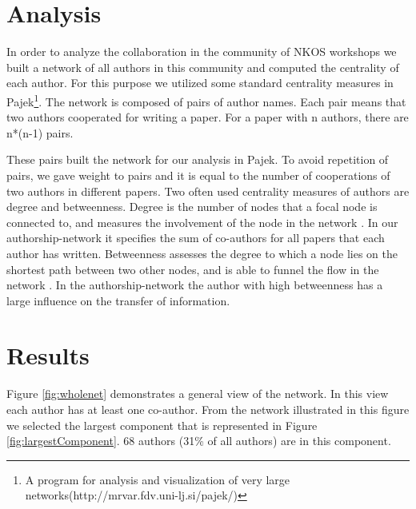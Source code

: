 \documentclass[runningheads,a4paper]{llncs}
\begin{document}


\section{Analysis}\label{analysis}

In order to analyze the collaboration in the community of NKOS workshops we built a network of all authors in this community and computed the centrality of each author. For this purpose we utilized some standard centrality measures in Pajek\footnote{A program for analysis and visualization of very large networks(http://mrvar.fdv.uni-lj.si/pajek/)}. The network is composed of pairs of author names. Each pair means that two authors cooperated for writing a paper. For a paper with n authors, there are n*(n-1) pairs. %

These pairs built the network for our analysis in Pajek. To avoid repetition of pairs, we gave weight to pairs and it is equal to the number of cooperations of two authors in different papers. 
Two often used centrality measures of authors are degree and betweenness. Degree is the number of nodes that a focal node is connected to, and measures the involvement of the node in the network \cite{Opsahl2010}. In our authorship-network it specifies the sum of co-authors for all papers that each author has written. Betweenness assesses the degree to which a node lies on the shortest path between two other nodes, and is able to funnel the flow in the network \cite{Opsahl2010}. In the authorship-network the author with high betweenness has a large influence on the transfer of information. 


\section{Results}\label{results}

Figure \ref{fig:wholenet} demonstrates a general view of the network. In this view each author has at least one co-author. From the network illustrated in this figure we selected the largest component that is represented in Figure \ref{fig:largestComponent}. 68 authors (31\% of all authors) are in this component.
\end{document}
